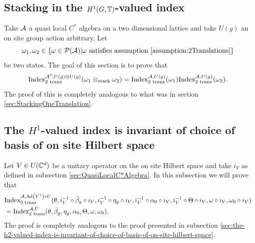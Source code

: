 \documentclass[12pt,a4paper,twoside]{article}
\numberwithin{equation}{section}
\begin{document}
\subsection{Stacking in the $H^1(G,\TT)$-valued index}\label{sec:StackingTwoTranslations}
Take $\AA$ a quasi local $C^*$ algebra on a two dimensional lattice and take $U(g)$ an on site group action arbitrary. Let
\begin{equation}
	\omega_1,\omega_2\in\{\omega\in\PP(\AA)| \omega\text{ satisfies assumption \ref{assumption:2Translations}}\}
\end{equation}
be two states. The goal of this section is to prove that
\begin{equation}\label{eq:IndexMorphismUnderStackingTwoTranslations}
	\textrm{Index}^{\AA^2,U(g)\otimes U(g)}_{\text{2 trans}}(\omega_1\otimes_{\text{stack}}\omega_2)=\textrm{Index}^{\AA,U(g)}_{\text{2 trans}}(\omega_1)\textrm{Index}^{\AA,U(g)}_{\text{2 trans}}(\omega_2).
\end{equation}
The proof of this is completely analogous to what was in section \ref{sec:StackingOneTranslation}.
\subsection{The $H^1$-valued index is invariant of choice of basis of on site Hilbert space}
Let $V \in U(\CC^d)$ be a unitary operator on the on site Hilbert space and take $i_V$ as defined in subsection \ref{sec:QuasiLocalC*Algebra}. In this subsection we will prove that
\begin{align}
	&\textrm{Index}^{\AA,\Ad{V^\dagger}\circ U}_{2\text{ trans}}(\theta,i_V^{-1}\circ\tilde{\beta}_g\circ i_V,i_V^{-1}\circ\eta_g\circ i_V,i_V^{-1}\circ\alpha_0\circ i_V,i_V^{-1}\circ\Theta\circ i_V,\omega\circ i_V,\omega_0\circ i_V)\\
	&=\textrm{Index}^{\AA,U}_{2\text{ trans}}(\theta,\tilde{\beta}_g,\eta_g,\alpha_0,\Theta,\omega,\omega_0).
\end{align}
The proof is completely analogous to the proof presented in subsection \ref{sec:the-h2-valued-index-is-invariant-of-choice-of-basis-of-on-site-hilbert-space}.
\end{document}
